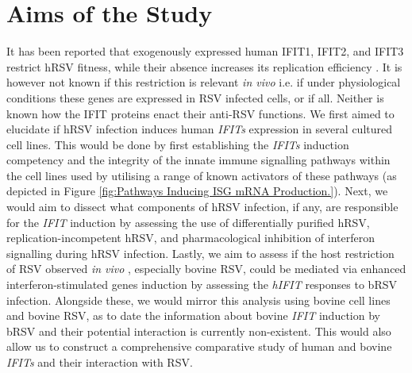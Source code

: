 \section{Aims of the Study} \label{sec:Aims}
It has been reported that exogenously expressed human IFIT1, IFIT2, and IFIT3 restrict hRSV fitness, while their absence increases its replication efficiency \cite{Drori2020InfluenzaProteins}. It is however not known if this restriction is relevant \textit{in vivo} i.e. if under physiological conditions these genes are expressed in RSV infected cells, or if all. Neither is known how the IFIT proteins enact their anti-RSV functions. We first aimed to elucidate if hRSV infection induces human \textit{IFITs} expression in several cultured cell lines. This would be done by first establishing the \textit{IFITs} induction competency and the integrity of the innate immune signalling pathways within the cell lines used by utilising a range of known activators of these pathways (as depicted in Figure \ref{fig:Pathways Inducing ISG mRNA Production.}). Next, we would aim to dissect what components of hRSV infection, if any, are responsible for the \textit{IFIT} induction by assessing the use of differentially purified hRSV, replication-incompetent hRSV, and pharmacological inhibition of interferon signalling during hRSV infection. Lastly, we aim to assess if the host restriction of RSV observed \textit{in vivo} \cite{Nair2013GlobalAnalysis, Sacco2014RespiratoryCattle}, especially bovine RSV, could be mediated via enhanced interferon-stimulated genes induction by assessing the \textit{hIFIT} responses to bRSV infection. Alongside these, we would mirror this analysis using bovine cell lines and bovine RSV, as to date the information about bovine \textit{IFIT} induction by bRSV and their potential interaction is currently non-existent. This would also allow us to construct a comprehensive comparative study of human and bovine \textit{IFITs} and their interaction with RSV.

